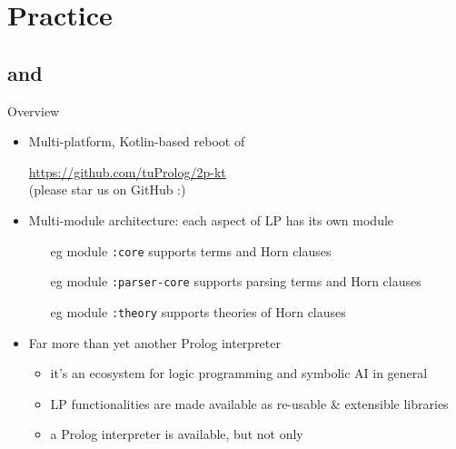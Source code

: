 \documentclass[presentation]{beamer}\mode<presentation>{\usetheme{AMSBolognaFC}}
\begin{document}
\section{Practice}

\subsection{\tuprolog{} and \twopkt{}}

\begin{frame}{\twopkt{} Overview}
    \begin{itemize}
        \item Multi-platform, Kotlin-based reboot of \tuprolog{}
        \begin{center}
            \alert{\url{https://github.com/tuProlog/2p-kt}}
            \\
            \small(please star us on GitHub :)
        \end{center}

        \vfill

        \item Multi-module architecture: each aspect of LP has its own module
        \begin{itemize}
            \item[eg] module \texttt{:core} supports \alert{terms and Horn clauses}
            \item[eg] module \texttt{:parser-core} supports \alert{parsing} terms and Horn clauses
            \item[eg] module \texttt{:theory} supports \alert{theories} of Horn clauses
        \end{itemize}

        \vfill

        \item Far more than yet another Prolog interpreter
        \begin{itemize}
            \item it's an \alert{ecosystem} for logic programming and symbolic AI in general
            \item LP functionalities are made available as re-usable \& extensible \alert{libraries}
            \item a Prolog interpreter is available, but not only
        \end{itemize}

    \end{itemize}
\end{frame}
\end{document}
